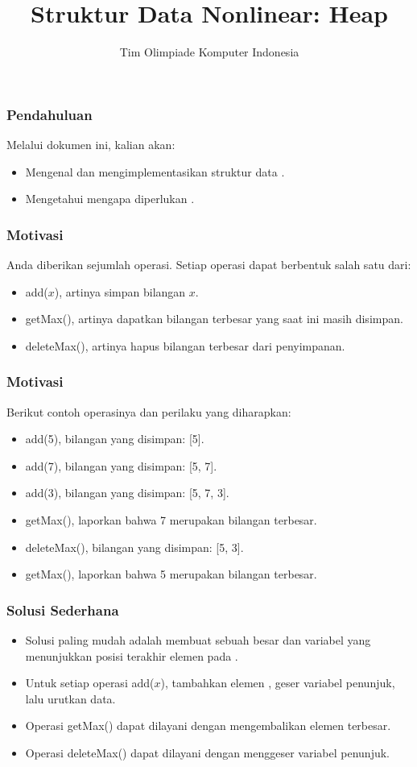

\title{Struktur Data Nonlinear: \newline Heap}
\author{Tim Olimpiade Komputer Indonesia}
\date{}



\begin{frame}
\titlepage
\end{frame}

\begin{frame}
\frametitle{Pendahuluan}
Melalui dokumen ini, kalian akan:
\begin{itemize}
  \item Mengenal dan mengimplementasikan struktur data \pheap.
  \item Mengetahui mengapa diperlukan \pheap.
\end{itemize}
\end{frame}

\begin{frame}
\frametitle{Motivasi}
Anda diberikan sejumlah operasi. Setiap operasi dapat berbentuk salah satu dari:
\begin{itemize}
  \item add($x$), artinya simpan bilangan $x$.
  \item getMax(), artinya  dapatkan bilangan terbesar yang saat ini masih disimpan.
  \item deleteMax(), artinya  hapus bilangan terbesar dari penyimpanan.
\end{itemize}
\end{frame}

\begin{frame}
\frametitle{Motivasi}
Berikut contoh operasinya dan perilaku yang diharapkan:
\begin{itemize}
  \item add(5), bilangan yang disimpan: [5].
  \item add(7), bilangan yang disimpan: [5, 7].
  \item add(3), bilangan yang disimpan: [5, 7, 3].
  \item getMax(), laporkan bahwa 7 merupakan bilangan terbesar.
  \item deleteMax(), bilangan yang disimpan: [5, 3].
  \item getMax(), laporkan bahwa 5 merupakan bilangan terbesar.
\end{itemize}
\end{frame}

\begin{frame}
\frametitle{Solusi Sederhana}
\begin{itemize}
  \item Solusi paling mudah adalah membuat sebuah \farray besar dan variabel yang menunjukkan posisi terakhir elemen pada \farray.
  \item Untuk setiap operasi add($x$), tambahkan elemen \farray, geser variabel penunjuk, lalu urutkan data. 
  \item Operasi getMax() dapat dilayani dengan mengembalikan elemen terbesar.
  \item Operasi deleteMax() dapat dilayani dengan menggeser variabel penunjuk.
\end{itemize}
\end{frame}

